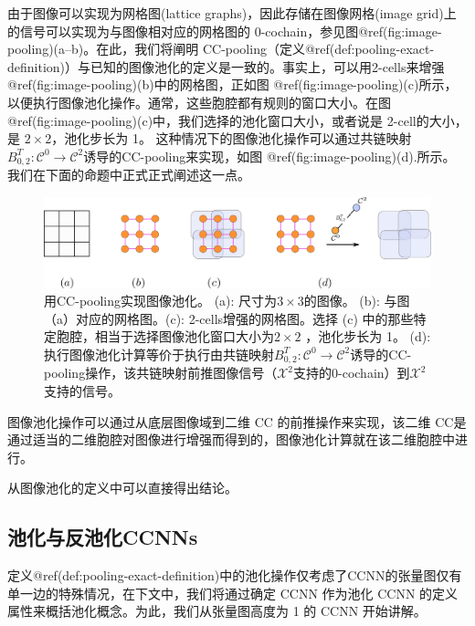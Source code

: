 \documentclass[
  12pt,
]{krantz}
\begin{document}
由于图像可以实现为网格图(lattice graphs)，因此存储在图像网格(image
grid)上的信号可以实现为与图像相对应的网格图的
0-cochain，参见图@ref(fig:image-pooling)(a--b)。在此，我们将阐明
CC-pooling（定义@ref(def:pooling-exact-definition)）与已知的图像池化的定义是一致的。事实上，可以用2-cells来增强@ref(fig:image-pooling)(b)中的网格图，正如图
@ref(fig:image-pooling)(c)所示，以便执行图像池化操作。通常，这些胞腔都有规则的窗口大小。在图@ref(fig:image-pooling)(c)中，我们选择的池化窗口大小，或者说是
2-cell的大小，是 \(2\times 2\)，池化步长为 1。
这种情况下的图像池化操作可以通过共链映射\(B_{0,2}^T \colon\mathcal{C}^0 \to \mathcal{C}^2\)诱导的CC-pooling来实现，如图
@ref(fig:image-pooling)(d).所示。我们在下面的命题中正式正式阐述这一点。

\begin{figure}

{\centering \includegraphics{figures/image_pooling} 

}

\caption{用CC-pooling实现图像池化。 (a): 尺寸为$3\times3$的图像。 (b): 与图（a）对应的网格图。(c): 2-cells增强的网格图。选择 (c) 中的那些特定胞腔，相当于选择图像池化窗口大小为$2\times 2$ ，池化步长为 1。 (d): 执行图像池化计算等价于执行由共链映射$B_{0,2}^T \colon\mathcal{C}^0 \to \mathcal{C}^2$诱导的CC-pooling操作，该共链映射前推图像信号（$\mathcal{X}^2$支持的$0$-cochain）到$\mathcal{X}^2$支持的信号。}\label{fig:image-pooling}
\end{figure}

\label{image-pool}
图像池化操作可以通过从底层图像域到二维 CC 的前推操作来实现，该二维
CC是通过适当的二维胞腔对图像进行增强而得到的，图像池化计算就在该二维胞腔中进行。

从图像池化的定义中可以直接得出结论。

\subsection{池化与反池化CCNNs}\label{pooling-and-unpooling-ccnns}

定义@ref(def:pooling-exact-definition)中的池化操作仅考虑了CCNN的张量图仅有单一边的特殊情况，在下文中，我们将通过确定
CCNN 作为池化 CCNN 的定义属性来概括池化概念。为此，我们从张量图高度为 1
的 CCNN 开始讲解。
\end{document}

